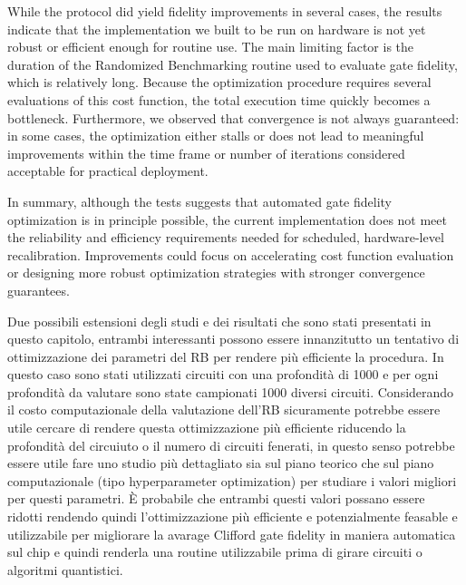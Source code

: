 While the protocol did yield fidelity improvements in several cases, the results indicate that the implementation we built to be run on hardware is not yet robust or efficient enough for routine use. 
The main limiting factor is the duration of the Randomized Benchmarking routine used to evaluate gate fidelity, which is relatively long. 
Because the optimization procedure requires several evaluations of this cost function, the total execution time quickly becomes a bottleneck. 
Furthermore, we observed that convergence is not always guaranteed: in some cases, the optimization either stalls or does not lead to meaningful improvements within the time frame or number of iterations considered acceptable for practical deployment.

In summary, although the tests suggests that automated gate fidelity optimization is in principle possible, the current implementation does not meet the reliability and efficiency requirements needed for scheduled, hardware-level recalibration. 
Improvements could focus on accelerating cost function evaluation or designing more robust optimization strategies with stronger convergence guarantees.

Due possibili estensioni degli studi e dei risultati che sono stati presentati in questo capitolo, entrambi interessanti possono essere innanzitutto un tentativo di ottimizzazione dei parametri del RB per rendere più efficiente la procedura.
In questo caso sono stati utilizzati circuiti con una profondità di 1000 e per ogni profondità da valutare sono state campionati 1000 diversi circuiti.
Considerando il costo computazionale della valutazione dell'RB sicuramente potrebbe essere utile cercare di rendere questa ottimizzazione più efficiente riducendo la profondità del circuiuto o il numero di circuiti fenerati, in questo senso potrebbe essere utile fare uno studio più dettagliato sia sul piano teorico che sul piano computazionale (tipo hyperparameter optimization) per studiare 
i valori migliori per questi parametri. È probabile che entrambi questi valori possano essere ridotti rendendo quindi l'ottimizzazione più efficiente e potenzialmente feasable e utilizzabile per migliorare la avarage Clifford gate fidelity in maniera automatica sul chip e quindi renderla una routine utilizzabile prima di girare circuiti o algoritmi quantistici.

